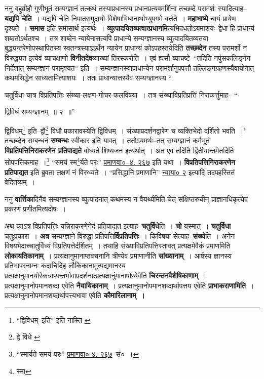 \documentclass[article,12pt,a4paper]{memoir}
\begin{document}
	  \pstart ननु बहुव्रीहौ गुणीभूतं सम्यग्ज्ञानं तत्कथं तस्याप्रधानस्य प्रधानप्रत्यवमर्शिना तच्छब्दे परामर्शः स्यादित्याह--\textbf{यद्यपि चेति} । यद्यपि चेति निपातसमुदायो विशेषाभिधानार्थाभ्युपगमे बर्त्तते । \textbf{महाभाष्ये} चायं प्रायेण दृश्यते । \textbf{समास} इति समासार्थ इत्यर्थः । \textbf{व्युत्पादयितव्यत्वात्प्रधानमि}त्यभिदधतोऽयमाशयः--द्वेधा हि प्राधान्यं शब्दतोऽर्थतश्च । तत्र शाब्देन न्यायेनासत्यपि प्राधान्ये सम्यग्ज्ञानस्य व्युत्पादयितव्यतया बुद्ध्यन्तरेणोपस्थापितस्य स्वतन्त्रस्याऽऽर्थेन न्यायेन प्राधान्यं कोऽपहस्तयेदिति \textbf{तच्छब्देन} तस्य परामर्शो न विरुद्ध्यत इत्येवं व्याचक्षाणो \textbf{विनीतदेव}व्याख्यां तिरस्करोति । एवं ह्यसौ व्याचष्टे--“तदिति नपुंसकलिङ्गेन निर्देशात् सम्यग्ज्ञानं परामृश्यत” इति । सम्यग्ज्ञानस्याप्राधान्येन परामर्शानुपपत्तौ तल्लिङ्गग्रहणस्यैवायोगात् कथमसिद्धेन साध्यतामित्याशयः । ततः प्राधान्यात्तस्यैव सम्यग्ज्ञानस्य  \leavevmode{} “
	  
	चतुर्विधा चात्र विप्रतिपत्तिः संख्या-लक्षण-गोचर-फलविषया । तत्र संख्याविप्रतिप्रत्तिं निराकर्त्तुमाह-- “
	  
	द्विविधं सम्यग्ज्ञानम् ॥ २ ॥” 
	  
	द्विविधम्\footnote{“द्विविधम्--इति” इति नास्ति \cite{dp-edH}} इति--द्वौ\footnote{द्वे विधे \cite{dp-msB}} विधौ प्रकारावस्येति द्विविधम् । संख्याप्रदर्शनद्वारेण च व्यक्तिभेदो दर्शितो भवति ।” तच्छब्देन सम्बन्धनं \textbf{सम्बन्धः} स्वीकार इति यावत् । ततोऽयमर्थः--तत् सम्यग्ज्ञानं कर्मभूतं \textbf{विप्रतिपत्तिनिराकरणेन प्रतिपाद्यते} बोध्यते शिष्यजन इत्यर्थात् । अत एव तदिति द्वितीयान्तमेतदिति सोपपत्तिकमाह ।\footnote{“स्मार्यते समयं परः” \href{http://http://sarit.indology.info/?cref=pv.4.267}{प्रमाणवा० ४. २६७}--सं० ।} “समयं स्म\footnote{स्मा}र्यते परः” \href{http://http://sarit.indology.info/?cref=pv.4.267}{प्रमाणवा०--४. २६७} इति यथा । \textbf{विप्रतिपत्तिनिराकरणेन प्रतिपाद्यत} इति ब्रुवता लक्षणं नं विरुध्यते । “प्रसिद्धानि प्रमाणानि” \href{http://http://sarit.indology.info/?cref=nā.2}{न्याया० २} इत्यादि तदपहस्तितं वेदितव्यम् ।
	\pend
      

	  \pstart ननु \textbf{वार्त्तिका}दिनैव सम्यग्ज्ञानस्य व्युत्पादनात् कथमस्य न वैयर्थ्यमिति चेत् संक्षिप्तरुचीन् प्राज्ञानधिकृत्येदं प्रकरणं प्रणीतमित्यदोषः ।
	\pend
      

	  \pstart अथ काऽत्र विप्रतिपत्तिः यन्निराकरणेनेदं प्रतिपाद्यत इत्याह--\textbf{चतुर्विधे}ति । \textbf{चो} यस्मात् । \textbf{चतुर्विधा} चतुःप्रकारा । \textbf{अत्र} सम्यग्ज्ञाने विरुद्धा प्रतिपत्ति\textbf{र्विप्रतिपत्तिः} । किंविषया सेत्याह--\textbf{संख्ये}ति । अनेन विषयभेदाच्चातुर्विध्यं विप्रतिपत्तेर्दर्शितम् । तथाहि संख्याविप्रतिपत्तिस्तावत् प्रत्यक्षमेवैकं प्रमाणमिति \textbf{लोकायतिकानाम्} । प्रत्यक्षानुमानाप्तवचनानि त्रीण्येव प्रमाणानीति \textbf{सांख्यानाम्} । आर्षस्य ज्ञानस्य प्रतिभापरनाम्नः कदाचिदिह लौकिकानामुत्पद्यमानस्य प्रत्यक्षानुमानयोरेकत्राप्यन्तर्भावाप्रदर्शनात्प्रत्यक्षानुंमानार्षाण्येवेति \textbf{चिरन्तनवैशेषिकाणाम्} । प्रत्यक्षानुमानोपमानशब्दा एवेति \textbf{नैयायिकानाम्} । प्रत्यक्षानुमानोपमानशब्दार्थापत्तय एवेति \textbf{प्राभाकराणामिति} । प्रत्यक्षानुमानोपमानशब्दार्थापत्त्यभावा एवेति \textbf{कौमारिलानाम् ।}
	\pend
      
\end{document}
